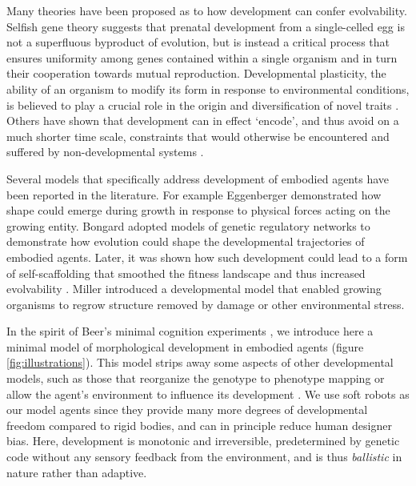 Many theories have been proposed as to how development can confer evolvability.
Selfish gene theory \cite{dawkins1982extended} suggests that prenatal development from a single-celled egg is not a superfluous byproduct of evolution, but is instead a critical process that ensures uniformity among genes contained within a single organism and in turn their cooperation towards mutual reproduction. 
Developmental plasticity, the ability of an organism to modify its form in response to environmental conditions, is believed to play a crucial role in the origin and diversification of novel traits \cite{Moczekrspb20110971}.
Others have shown that development can in effect `encode', and thus
avoid on a much shorter time scale, constraints that would otherwise
be encountered and suffered by non-developmental systems
\cite{kouvaris2017evolution}.

Several models that specifically address development of embodied agents have been reported in
the literature.
For example Eggenberger \cite{Eggenberger97} demonstrated how shape could emerge during growth in response to physical
forces acting on the growing entity.
Bongard \cite{Bongard01} adopted models of genetic regulatory networks to demonstrate how evolution could shape the developmental
trajectories of embodied agents. Later, it was shown how such development could lead to a form of self-scaffolding
that smoothed the fitness landscape and thus increased evolvability \cite{Bongard11}.
Miller \cite{miller2004evolving} introduced a developmental model that enabled growing organisms to regrow structure
removed by damage or other environmental stress.

In the spirit of Beer's minimal cognition experiments \cite{beer1996toward}, we introduce here a minimal model of morphological development in embodied agents (figure \ref{fig:illustrations}).
This model strips away some aspects of other developmental
models, such as those that reorganize the genotype to phenotype mapping
\cite{Eggenberger97, Bongard01, kouvaris2017evolution} or allow the agent's environment to influence its development
\cite{hinton1987learning, miller2004evolving}.
We use soft robots as our model agents since they provide many more degrees of developmental freedom compared to rigid bodies, and can in principle reduce human designer bias.
Here, development is monotonic and irreversible, predetermined by genetic code without any sensory feedback from the environment, and is thus 
\textit{ballistic} in nature rather than adaptive.


